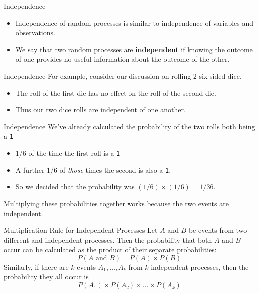 \begin{frame}{Independence}
    \begin{itemize}
        \item Independence of random processes is similar to independence of variables and observations.
        \item We say that two random processes are \textbf{independent} if knowing the outcome of one provides no useful information about the outcome of the other.
    \end{itemize}
\end{frame}

\begin{frame}{Independence}
    For example, consider our discussion on rolling 2 six-sided dice.
    \begin{itemize}
        \item The roll of the first die has no effect on the roll of the second die.
        \item Thus our two dice rolls are independent of one another. 
    \end{itemize}
\end{frame}

\begin{frame}{Independence}
    We've already calculated the probability of the two rolls both being a \texttt{1}
    \begin{itemize}
        \item 1/6 of the time the first roll is a \texttt{1}
        \item A further 1/6 of \textit{those} times the second is also a \texttt{1}.
        \item So we decided that the probability was $(1/6)\times(1/6)=1/36$.
    \end{itemize}
    Multiplying these probabilities together works because the two events are independent.
\end{frame}

\begin{frame}{Multiplication Rule for Independent Processes}
    Let $A$ and $B$ be events from two different and independent processes. Then the probability that both $A$ and $B$ occur can be calculated as the product of their separate probabilities:
    \[ 
        P (A\text{ and }B) = P (A) \times P (B)
    \]
    Similarly, if there are $k$ events $A_1, \dots, A_k$ from $k$ independent processes, then the probability they all occur is
    \[
        P(A_1)\times P(A_2)\times\dots\times P(A_k)
    \]
\end{frame}

